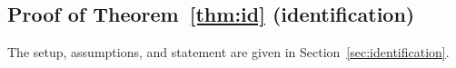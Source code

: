 
\subsection{Proof of Theorem~\ref{thm:id} (identification)}
\label{app:idproofs}

The setup, assumptions, and statement are given in Section~\ref{sec:identification}.

